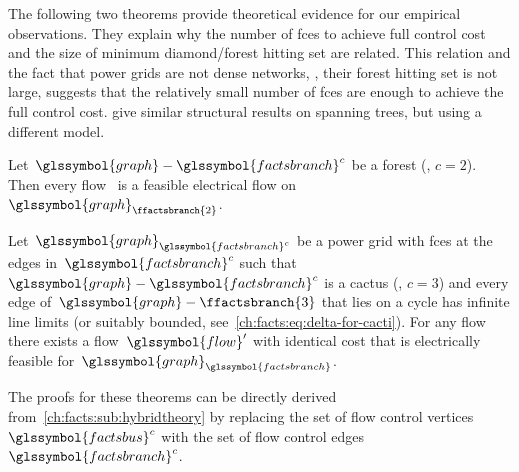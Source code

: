 The following two theorems provide theoretical evidence for our empirical
observations. They explain why the number of \gls{fce}s to achieve full
control cost and the size of minimum diamond/forest hitting set are related.
This relation and the fact that power grids are not dense networks, \ie, their
forest hitting set is not large, suggests that the relatively small number of
\gls{fce}s are enough to achieve the full control cost. \textcite{6507352}
give similar structural results on spanning trees, but using a different model.
% 
\begin{theorem}
    Let~$\glssymbol{graph}-\glssymbol{factsbranch}^c$ be a forest (\ie, $c =
    2$). Then every flow~ is a feasible electrical flow
    on~$\glssymbol{graph}_{\ffactsbranch{2}}$.
\end{theorem}
% 
\begin{theorem}
    Let~$\glssymbol{graph}_{\glssymbol{factsbranch}^c}$ be a power grid with
    \gls{fce}s at the edges in~$\glssymbol{factsbranch}^c$ such
    that~$\glssymbol{graph}-\glssymbol{factsbranch}^c$ is a cactus (\ie, $c =
    3$) and every edge of~$\glssymbol{graph}-\ffactsbranch{3}$ that lies on a
    cycle has infinite line limits (or suitably bounded,
    see~\cref{ch:facts:eq:delta-for-cacti}). For any flow~ there
    exists a flow~$\glssymbol{flow}'$ with identical cost that is electrically
    feasible for~$\glssymbol{graph}_{\glssymbol{factsbranch}}$.
\end{theorem}
% 
The proofs for these theorems can be directly derived
from~\cref{ch:facts:sub:hybridtheory} by replacing the set of flow control
vertices~$\glssymbol{factsbus}^c$ with the set of flow control
edges~$\glssymbol{factsbranch}^c$.
%
